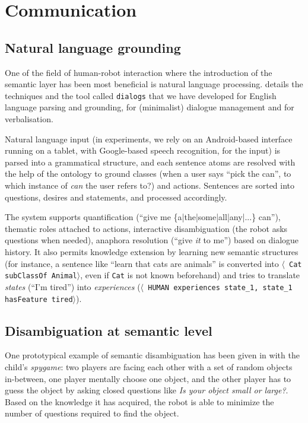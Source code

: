 \documentclass[letterpaper, 10 pt, conference]{ieeeconf}  %
\newcommand{\concept}[1]{{\small \texttt{#1}}}
\newcommand{\stmt}[1]{{\footnotesize \tt $\langle$ #1\relax$\rangle$}}
\begin{document}
\section{Communication}
\label{sect|com}

\subsection{Natural language grounding}

One of the field of human-robot interaction where the introduction of the
semantic layer has been most beneficial is natural language processing.
\cite{Lemaignan2011a} details the techniques and the tool called
\texttt{dialogs} that we have developed for English language parsing and
grounding, for (minimalist) dialogue management and for verbalisation.

Natural language input (in experiments, we rely on an Android-based interface
running on a tablet, with Google-based speech recognition, for the input) is
parsed into a grammatical structure, and each sentence atoms are resolved with
the help of the ontology to ground classes (when a user says ``pick the can'',
to which instance of \emph{can} the user refers to?) and actions. Sentences are
sorted into questions, desires and statements, and processed accordingly.

The system supports quantification (``give me \{a|the|some|all|any|...\} can''),
thematic roles attached to actions, interactive disambiguation (the robot asks
questions when needed), anaphora resolution (``give \emph{it} to me'') based on
dialogue history. It also permits knowledge extension by learning new semantic
structures (for instance, a sentence like ``learn that cats are animals'' is
converted into \stmt{Cat subClassOf Animal}, even if \concept{Cat} is not known
beforehand) and tries to translate \emph{states} (``I'm tired'') into
\emph{experiences} (\stmt{HUMAN experiences state\_1, state\_1 hasFeature
tired}).

\subsection{Disambiguation at semantic level}

One prototypical example of semantic disambiguation has been given in
\cite{Ros2010b} with the child's \emph{spygame}: two players are facing
each other with a set of random objects in-between, one player mentally choose
one object, and the other player has to guess the object by asking closed
questions like \emph{Is your object small or large?}. Based on the knowledge it
has acquired, the robot is able to minimize the number of questions required to
find the object.
\end{document}
